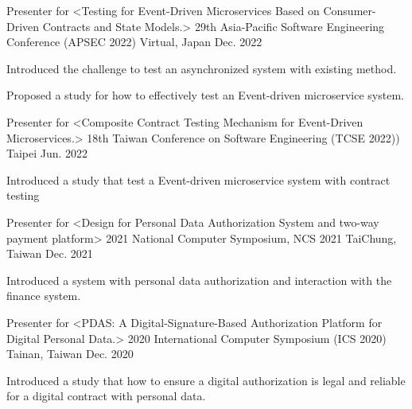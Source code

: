 

\begin{cventries}

  \cventry
    {Presenter for <Testing for Event-Driven Microservices Based on Consumer-Driven Contracts and State Models.>} %
    {29th Asia-Pacific Software Engineering Conference (APSEC 2022)} %
    {Virtual, Japan} %
    {Dec. 2022} %
    {
      \begin{cvitems} %
        \item {Introduced the challenge to test an asynchronized system with existing method.}
        \item {Proposed a study for how to effectively test an Event-driven microservice system.}
      \end{cvitems}
    }

  \cventry
    {Presenter for <Composite Contract Testing Mechanism for Event-Driven Microservices.>} %
    {18th Taiwan Conference on Software Engineering (TCSE 2022))} %
    {Taipei} %
    {Jun. 2022} %
    {
      \begin{cvitems} %
        \item {Introduced a study that test a Event-driven microservice system with contract testing}
      \end{cvitems}
    }

  \cventry
    {Presenter for <Design for Personal Data Authorization System and two-way payment platform>} %
    {2021 National Computer Symposium, NCS 2021} %
    {TaiChung, Taiwan} %
    {Dec. 2021} %
    {
      \begin{cvitems} %
        \item {Introduced a system with personal data authorization and interaction with the finance system.}
      \end{cvitems}
    }

  \cventry
    {Presenter for <PDAS: A Digital-Signature-Based Authorization Platform for Digital Personal Data.>} %
    {2020 International Computer Symposium (ICS 2020)} %
    {Tainan, Taiwan} %
    {Dec. 2020} %
    {
      \begin{cvitems} %
        \item {Introduced a study that how to ensure a digital authorization is legal and reliable for a digital contract with personal data.}
      \end{cvitems}
    }

\end{cventries}
